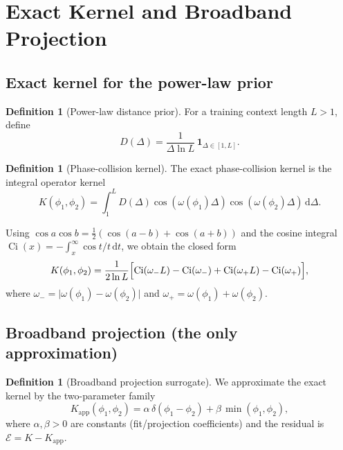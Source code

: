 \documentclass[11pt]{article}
\theoremstyle{plain}
\theoremstyle{definition}
\newtheorem{definition}[theorem]{Definition}
\theoremstyle{remark}
\newcommand{\Ci}{\operatorname{Ci}}
\newcommand{\E}{\mathcal{E}}
\newcommand{\dd}{\,\mathrm{d}}
\begin{document}
\section{Exact Kernel and Broadband Projection}

\subsection{Exact kernel for the power-law prior}

\begin{definition}[Power-law distance prior]
For a training context length $L>1$, define
\begin{equation}
D(\Delta)=\frac{1}{\Delta\ln L}\,\mathbf{1}_{\Delta\in[1,L]}.
\end{equation}
\end{definition}

\begin{definition}[Phase-collision kernel]
The exact phase-collision kernel is the integral operator kernel
\begin{equation}
K(\phi_1,\phi_2)=\int_1^L D(\Delta)\cos(\omega(\phi_1)\Delta)\cos(\omega(\phi_2)\Delta)\dd\Delta.
\label{eq:exact_kernel_def}
\end{equation}
\end{definition}

Using $\cos a\cos b=\tfrac{1}{2}(\cos(a-b)+\cos(a+b))$ and the cosine integral
$\Ci(x)=-\int_x^\infty \cos t/t\dd t$, we obtain the closed form
\begin{equation}
K(\phi_1,\phi_2)
=\frac{1}{2\ln L}\Bigl[\Ci(\omega_- L)-\Ci(\omega_-)+\Ci(\omega_+ L)-\Ci(\omega_+)\Bigr],
\label{eq:exact_kernel_ci}
\end{equation}
where $\omega_-=\lvert \omega(\phi_1)-\omega(\phi_2)\rvert$ and
$\omega_+=\omega(\phi_1)+\omega(\phi_2)$.

\subsection{Broadband projection (the only approximation)}

\begin{definition}[Broadband projection surrogate]
We approximate the exact kernel by the two-parameter family
\begin{equation}
K_{\mathrm{app}}(\phi_1,\phi_2)=\alpha\,\delta(\phi_1-\phi_2)+\beta\,\min(\phi_1,\phi_2),
\label{eq:broadband_projection}
\end{equation}
where $\alpha,\beta>0$ are constants (fit/projection coefficients) and the
residual is $\E=K-K_{\mathrm{app}}$.
\end{definition}
\end{document}
